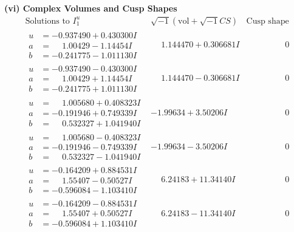 \documentclass[1p]{elsarticle_modified}
\theoremstyle{definition}
\newcommand{\I}{\sqrt{-1}}
\begin{document}
\newpage\flushleft \textbf{(vi) Complex Volumes and Cusp Shapes}
$$\begin{array}{c|c|c}  
\text{Solutions to }I^u_{1}& \I (\text{vol} + \sqrt{-1}CS) & \text{Cusp shape}\\
 \hline 
\begin{aligned}
u &= -0.937490 + 0.430300 I \\
a &= \phantom{-}1.00429 - 1.14454 I \\
b &= -0.241775 - 1.011130 I\end{aligned}
 & \phantom{-}1.144470 + 0.306681 I & \phantom{-0.000000 } 0 \\ \hline\begin{aligned}
u &= -0.937490 - 0.430300 I \\
a &= \phantom{-}1.00429 + 1.14454 I \\
b &= -0.241775 + 1.011130 I\end{aligned}
 & \phantom{-}1.144470 - 0.306681 I & \phantom{-0.000000 } 0 \\ \hline\begin{aligned}
u &= \phantom{-}1.005680 + 0.408323 I \\
a &= -0.191946 + 0.749339 I \\
b &= \phantom{-}0.532327 + 1.041940 I\end{aligned}
 & -1.99634 + 3.50206 I & \phantom{-0.000000 } 0 \\ \hline\begin{aligned}
u &= \phantom{-}1.005680 - 0.408323 I \\
a &= -0.191946 - 0.749339 I \\
b &= \phantom{-}0.532327 - 1.041940 I\end{aligned}
 & -1.99634 - 3.50206 I & \phantom{-0.000000 } 0 \\ \hline\begin{aligned}
u &= -0.164209 + 0.884531 I \\
a &= \phantom{-}1.55407 - 0.50527 I \\
b &= -0.596084 - 1.103410 I\end{aligned}
 & \phantom{-}6.24183 + 11.34140 I & \phantom{-0.000000 } 0 \\ \hline\begin{aligned}
u &= -0.164209 - 0.884531 I \\
a &= \phantom{-}1.55407 + 0.50527 I \\
b &= -0.596084 + 1.103410 I\end{aligned}
 & \phantom{-}6.24183 - 11.34140 I & \phantom{-0.000000 } 0 \\ \hline\begin{aligned}

\end{aligned}
\end{array}$$
\end{document}
